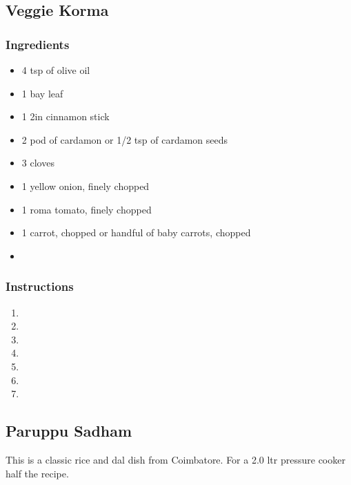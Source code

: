 \documentclass[11pt]{article}
\begin{document}
\subsection{Veggie Korma}
\label{sec:orgc71206b}
\subsubsection*{Ingredients}
\label{sec:orgf0a456c}
\begin{itemize}
\item 4 tsp of olive oil
\item 1 bay leaf
\item 1 2in cinnamon stick
\item 2 pod of cardamon or 1/2 tsp of cardamon seeds
\item 3 cloves
\item 1 yellow onion, finely chopped
\item 1 roma tomato, finely chopped
\item 1 carrot, chopped or handful of baby carrots, chopped
\item 
\end{itemize}
\subsubsection*{Instructions}
\label{sec:org93b1d13}
\begin{enumerate}
\item 

\item 

\item 

\item 

\item 

\item 

\item 
\end{enumerate}
\subsection{Paruppu Sadham}
\label{sec:org7ba80eb}
This is a classic rice and dal dish from Coimbatore. For a 2.0 ltr pressure cooker half the recipe.
\end{document}
